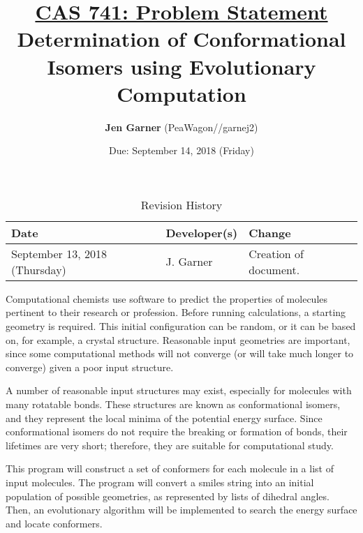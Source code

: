 \documentclass{article}
\title{\underline{CAS 741: Problem Statement}\\{\Large Determination of Conformational Isomers using Evolutionary Computation}}
\author{\textbf{Jen Garner} (PeaWagon//garnej2)}
\date{Due: September 14, 2018 (Friday)}
\begin{document}
\maketitle

\begin{table}[hp]
\caption{Revision History} \label{TblRevisionHistory}
\begin{tabularx}{\textwidth}{llX}
\toprule
\textbf{Date} & \textbf{Developer(s)} & \textbf{Change}\\
\midrule
September 13, 2018 (Thursday) & J. Garner & Creation of document. \\
\bottomrule
\end{tabularx}
\end{table}


\vspace{2mm} %

Computational chemists use software to predict the properties of molecules pertinent to their research or profession. Before running calculations, a starting geometry is required. This initial configuration can be random, or it can be based on, for example, a crystal structure. Reasonable input geometries are important, since some computational methods will not converge (or will take much longer to converge) given a poor input structure. 

A number of reasonable input structures may exist, especially for molecules with many rotatable bonds. These structures are known as conformational isomers, and they represent the local minima of the potential energy surface. Since conformational isomers do not require the breaking or formation of bonds, their lifetimes are very short; therefore, they are suitable for computational study.

\vspace{3mm} %


\vspace{2mm} %

This program will construct a set of conformers for each molecule in a list of input molecules. The program will convert a smiles string into an initial population of possible geometries, as represented by lists of dihedral angles. Then, an evolutionary algorithm will be implemented to search the energy surface and locate conformers.

\vspace{3mm} %
\end{document}
